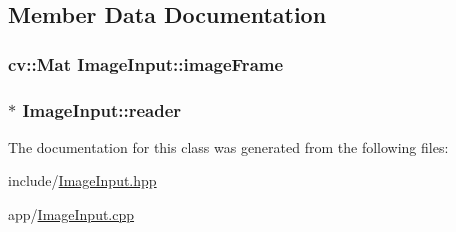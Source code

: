\subsection{Member Data Documentation}
\subsubsection[{\texorpdfstring{image\+Frame}{imageFrame}}]{\setlength{\rightskip}{0pt plus 5cm}cv\+::\+Mat Image\+Input\+::image\+Frame\hspace{0.3cm}{\ttfamily [private]}}\hypertarget{classImageInput_a94723568a2a817760fe4e38fc11efb25}{}\label{classImageInput_a94723568a2a817760fe4e38fc11efb25}
\subsubsection[{\texorpdfstring{reader}{reader}}]{$\ast$ Image\+Input\+::reader\hspace{0.3cm}{\ttfamily [private]}}\hypertarget{classImageInput_a23a93c13b57550831c58c0b5485efe01}{}\label{classImageInput_a23a93c13b57550831c58c0b5485efe01}


The documentation for this class was generated from the following files\+:\begin{DoxyCompactItemize}
\item 
include/\hyperlink{ImageInput_8hpp}{Image\+Input.\+hpp}\item 
app/\hyperlink{ImageInput_8cpp}{Image\+Input.\+cpp}\end{DoxyCompactItemize}
